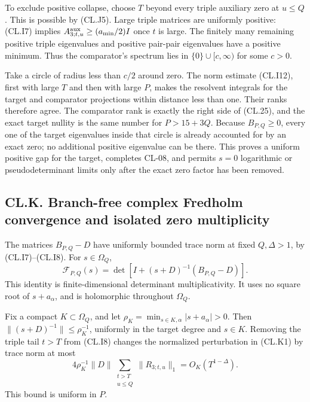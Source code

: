 To exclude positive collapse, choose \(T\) beyond every triple auxiliary zero at \(u\leq Q\). This is possible by (CL.J5). Large triple matrices are uniformly positive: (CL.I7) implies \(A_{3;t,u}^{\rm aux}\geq(a_{\min}/2)I\) once \(t\) is large. The finitely many remaining positive triple eigenvalues and positive pair-pair eigenvalues have a positive minimum. Thus the comparator's spectrum lies in \(\{0\}\cup[c,\infty)\) for some \(c>0\).

Take a circle of radius less than \(c/2\) around zero. The norm estimate (CL.I12), first with large \(T\) and then with large \(P\), makes the resolvent integrals for the target and comparator projections within distance less than one. Their ranks therefore agree. The comparator rank is exactly the right side of (CL.25), and the exact target nullity is the same number for \(P>15+3Q\). Because \(B_{P,Q}\geq0\), every one of the target eigenvalues inside that circle is already accounted for by an exact zero; no additional positive eigenvalue can be there. This proves a uniform positive gap for the target, completes CL-08, and permits \(s=0\) logarithmic or pseudodeterminant limits only after the exact zero factor has been removed.

\hypertarget{cl.k.-branch-free-complex-fredholm-convergence-and-isolated-zero-multiplicity}{%
\subsection{CL.K. Branch-free complex Fredholm convergence and isolated zero multiplicity}\label{cl.k.-branch-free-complex-fredholm-convergence-and-isolated-zero-multiplicity}}

The matrices \(B_{P,Q}-D\) have uniformly bounded trace norm at fixed \(Q,\Delta>1\), by (CL.I7)--(CL.I8). For \(s\in\Omega_Q\), \[
\mathcal F_{P,Q}(s)
=\det\!\left[I+(s+D)^{-1}(B_{P,Q}-D)\right].
\tag{CL.K1}
\] This identity is finite-dimensional determinant multiplicativity. It uses no square root of \(s+a_\alpha\), and is holomorphic throughout \(\Omega_Q\).

Fix a compact \(K\subset\Omega_Q\), and let \(\rho_K=\min_{s\in K,\alpha}|s+a_\alpha|>0\). Then \(\|(s+D)^{-1}\|\leq\rho_K^{-1}\), uniformly in the target degree and \(s\in K\). Removing the triple tail \(t>T\) from (CL.I8) changes the normalized perturbation in (CL.K1) by trace norm at most \[
4\rho_K^{-1}\|D\|
\sum_{\substack{t>T\\u\leq Q}}\|R_{3;t,u}\|_1
=O_K(T^{1-\Delta}).
\tag{CL.K2}
\] This bound is uniform in \(P\).


